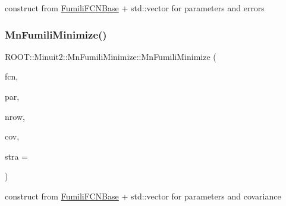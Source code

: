 construct from \mbox{\hyperlink{classROOT_1_1Minuit2_1_1FumiliFCNBase}{Fumili\+F\+C\+N\+Base}} + std\+::vector for parameters and errors 

\mbox{\label{classROOT_1_1Minuit2_1_1MnFumiliMinimize_ad12e919e837251ef358a0d461355e51c}} 
\subsubsection{\texorpdfstring{MnFumiliMinimize()}{MnFumiliMinimize()}\hspace{0.1cm}{\footnotesize\ttfamily [16/21]}}
{\footnotesize\ttfamily R\+O\+O\+T\+::\+Minuit2\+::\+Mn\+Fumili\+Minimize\+::\+Mn\+Fumili\+Minimize (\begin{DoxyParamCaption}\item[{const \mbox{\hyperlink{classROOT_1_1Minuit2_1_1FumiliFCNBase}{Fumili\+F\+C\+N\+Base}} \&}]{fcn,  }\item[{const std\+::vector$<$ double $>$ \&}]{par,  }\item[{unsigned int}]{nrow,  }\item[{const std\+::vector$<$ double $>$ \&}]{cov,  }\item[{unsigned int}]{stra = {} }\end{DoxyParamCaption})\hspace{0.3cm}{\ttfamily [inline]}}



construct from \mbox{\hyperlink{classROOT_1_1Minuit2_1_1FumiliFCNBase}{Fumili\+F\+C\+N\+Base}} + std\+::vector for parameters and covariance 

\mbox{\label{classROOT_1_1Minuit2_1_1MnFumiliMinimize_a48eae3f1c5b8eef3b6940d3fd5d26af8}} 

